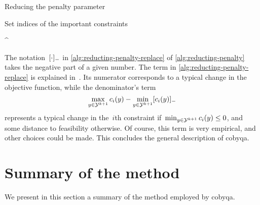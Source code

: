 \begin{algorithm}
    \caption{Reducing the penalty parameter}
    \label{alg:reducting-penalty}
    \DontPrintSemicolon
    Set indices of the important constraints
    \begin{algomathdisplay}
        \iub^{\ast} \eqdef {}
    \end{algomathdisplay}
\end{algorithm}
%

The notation~$[\cdot]_-$ in \cref{alg:reducting-penalty-replace} of \cref{alg:reducting-penalty} takes the negative part of a given number.
The term in \cref{alg:reducting-penalty-replace} is explained in~\cite[\S~4]{Powell_1994}.
Its numerator corresponds to a typical change in the objective function, while the denominator's term
\begin{equation*}
    \max_{y \in \xpt[k + 1]} \con{i}(y) - \min_{y \in \xpt[k + 1]} \negp{\con{i}(y)}
\end{equation*}
represents a typical change in the~$i$th constraint if~$\min_{y \in \xpt[k + 1]} \con{i}(y) \le 0$, and some distance to feasibility otherwise.
Of course, this term is very empirical, and other choices could be made.
This concludes the general description of \gls{cobyqa}.

\section{Summary of the method}

We present in this section a summary of the method employed by \gls{cobyqa}.

